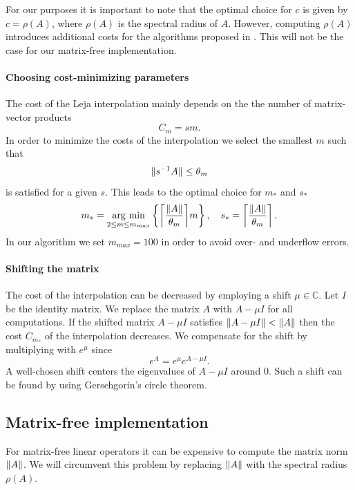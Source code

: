 \documentclass{scrartcl}
\begin{document}
For our purposes it is important to note that the optimal choice for $c$ is given by $c = \rho(A)$, where $\rho(A)$ is the spectral radius of $A$. However, computing $\rho(A)$ introduces additional costs for the algorithms proposed in \cite{lejarev}. This will not be the case for our matrix-free implementation.

\paragraph{Choosing cost-minimizing parameters}
The cost of the Leja interpolation mainly depends on the the number of matrix-vector products
\[
C_{m} = sm. 
\]
In order to minimize the costs of the interpolation we select the smallest $m$ such that
\[
\lVert s^{-1}A\rVert \le \theta_m
\]
is satisfied for a given $s$. This leads to the optimal choice for $m_*$ and $s_*$ 
\[
m_* = \underset{2\le m\le m_{max}}{\operatorname{arg\ min}}  \left\{{\left\lceil{\frac{\norm{A}}{\theta_m}}\right\rceil}m\right\}, \quad
s_* =  \left\lceil{\frac{\norm{A}}{\theta_m}}\right\rceil.
\]
In our algorithm we set $m_{max} = 100$ in order to avoid over- and underflow errors.

\paragraph{Shifting the matrix}
The cost of the interpolation can be decreased by employing a shift $\mu\in\mathbb{C}$. Let $I$ be the identity matrix. We replace the matrix $A$ with $A-\mu I$ for all computations. If the shifted matrix $A-\mu I$ satisfies $\lVert A -\mu I\rVert < \lVert A\rVert$ then the cost $C_{m_*}$ of the interpolation decreases.
We compensate for the shift by multiplying with $e^\mu$ since
\[
	e^{A} = e^{\mu}e^{A-\mu I}.
\]
A well-chosen shift centers the eigenvalues of $A-\mu I$ around $0$. Such a shift can be found by using Gerschgorin's circle theorem.

\subsection{Matrix-free implementation}
For matrix-free linear operators it can be expensive to compute the matrix norm $\lVert A\rVert$. We will circumvent this problem by replacing $\lVert A\rVert$ with the spectral radius $\rho(A)$. 
\end{document}
